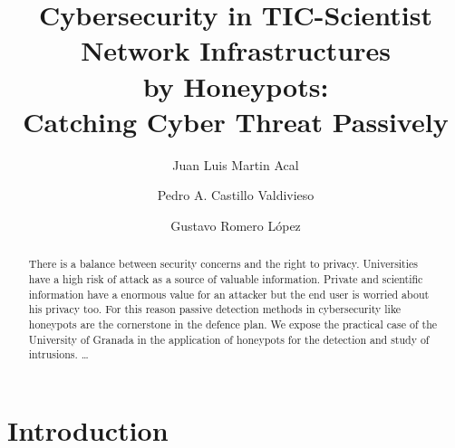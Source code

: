 \documentclass[a4paper]{llncs}
\begin{document}
\pagestyle{empty}

\mainmatter

\title{Cybersecurity in TIC-Scientist Network Infrastructures\\by
  Honeypots:\\Catching Cyber Threat Passively}


\author{Juan Luis Martin Acal \and Pedro A. Castillo Valdivieso
\and Gustavo Romero López} %



\maketitle

\begin{abstract}
There is a balance between security concerns and the right to
privacy. %
  Universities have a high risk of attack as a source of valuable
  information. %
Private and scientific information have a enormous value for an
attacker but the end user is worried about his privacy too. %
 For this reason passive detection methods in cybersecurity like
 honeypots are the cornerstone in the defence plan. We expose the
 practical case of the University of Granada in the application of
 honeypots for the detection and study of intrusions. 
\dots
\end{abstract}


\section{Introduction}
\end{document}
